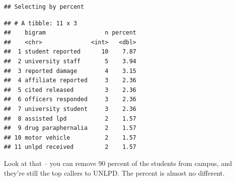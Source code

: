 \documentclass[]{book}
\newenvironment{Shaded}{\begin{snugshade}}{\end{snugshade}}
\newcommand{\DataTypeTok}[1]{\textcolor[rgb]{0.13,0.29,0.53}{#1}}
\newcommand{\DecValTok}[1]{\textcolor[rgb]{0.00,0.00,0.81}{#1}}
\newcommand{\KeywordTok}[1]{\textcolor[rgb]{0.13,0.29,0.53}{\textbf{#1}}}
\newcommand{\NormalTok}[1]{#1}
\newcommand{\OperatorTok}[1]{\textcolor[rgb]{0.81,0.36,0.00}{\textbf{#1}}}
\newcommand{\OtherTok}[1]{\textcolor[rgb]{0.56,0.35,0.01}{#1}}
\newcommand{\StringTok}[1]{\textcolor[rgb]{0.31,0.60,0.02}{#1}}
\begin{document}
\begin{Shaded}
\end{Shaded}

\begin{verbatim}
## Selecting by percent
\end{verbatim}

\begin{verbatim}
## # A tibble: 11 x 3
##    bigram                 n percent
##    <chr>              <int>   <dbl>
##  1 student reported      10    7.87
##  2 university staff       5    3.94
##  3 reported damage        4    3.15
##  4 affiliate reported     3    2.36
##  5 cited released         3    2.36
##  6 officers responded     3    2.36
##  7 university student     3    2.36
##  8 assisted lpd           2    1.57
##  9 drug paraphernalia     2    1.57
## 10 motor vehicle          2    1.57
## 11 unlpd received         2    1.57
\end{verbatim}

Look at that -- you can remove 90 percent of the students from campus, and they're still the top callers to UNLPD. The percent is almost no different.
\end{document}
